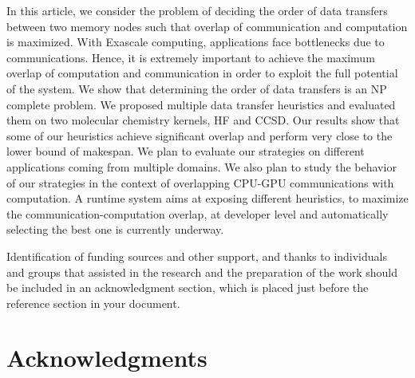 \documentclass[sigconf]{acmart}
\begin{document}
In this article, we consider the problem of deciding the order of data transfers between two memory nodes such that overlap of communication and  computation is maximized. With Exascale computing, applications face bottlenecks due to communications. Hence, it is extremely important to achieve the maximum overlap of computation and communication in order to exploit the full potential of the system. We show that determining the order of data transfers is an NP complete problem. We proposed multiple data transfer heuristics and evaluated them on two molecular chemistry kernels, HF and CCSD. Our results show that some of our heuristics achieve significant overlap and perform very close to the lower bound of makespan. We plan to evaluate our strategies on different applications coming from multiple domains. We also plan to study the behavior of our strategies in the context of overlapping CPU-GPU communications with computation. A runtime system aims at exposing different heuristics, to maximize the communication-computation overlap, at developer level and automatically selecting the best one is currently underway.


\begin{acks}
Identification of funding sources and other support, and thanks to individuals and groups that assisted in the research and the preparation of the work should be included in an acknowledgment section, which is placed just before the reference section in your document. 

\end{acks}

\section{Acknowledgments}



%


\end{document}
